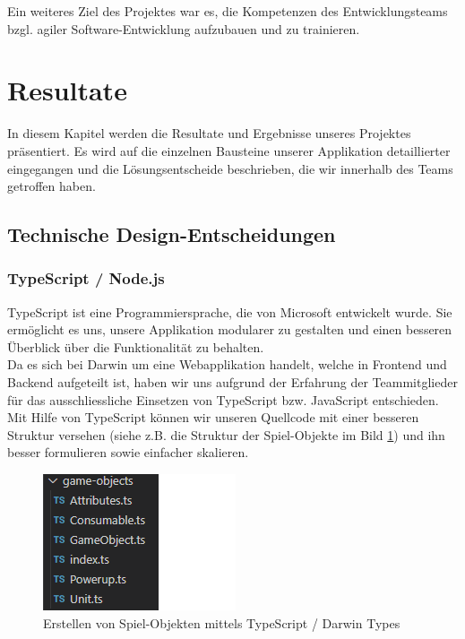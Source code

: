 \documentclass[11pt,a4paper,titlepage]{article}
\begin{document}
Ein weiteres Ziel des Projektes war es, die Kompetenzen des Entwicklungsteams bzgl. agiler Software-Entwicklung aufzubauen und zu trainieren.

\newpage

\section{Resultate}
In diesem Kapitel werden die Resultate und Ergebnisse unseres Projektes präsentiert.
Es wird auf die einzelnen Bausteine unserer Applikation detaillierter eingegangen und die Lösungsentscheide beschrieben, die wir innerhalb des Teams getroffen haben.

\subsection{Technische Design-Entscheidungen}
\subsubsection{TypeScript / Node.js}
TypeScript ist eine Programmiersprache, die von Microsoft entwickelt wurde. Sie ermöglicht es uns, unsere Applikation modularer zu gestalten und einen besseren Überblick über die Funktionalität zu behalten.\\
Da es sich bei Darwin um eine Webapplikation handelt, welche in Frontend und Backend aufgeteilt ist, haben wir uns aufgrund der Erfahrung der Teammitglieder für das ausschliessliche Einsetzen von TypeScript bzw. JavaScript entschieden.
Mit Hilfe von TypeScript können wir unseren Quellcode mit einer besseren Struktur versehen (siehe z.B. die Struktur der Spiel-Objekte im Bild \ref{types}) und ihn besser formulieren sowie einfacher skalieren.

\begin{figure}[H]
	\centering
	\includegraphics{darwintypes.png}
	\caption{Erstellen von Spiel-Objekten mittels TypeScript / Darwin Types}
	\label{types}
\end{figure}
\end{document}
